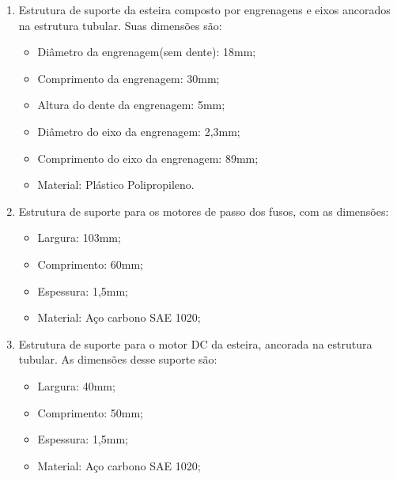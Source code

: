 \begin{enumerate}
\begin{enumerate}
    \item Estrutura de suporte da esteira composto por engrenagens e eixos ancorados na estrutura tubular. Suas dimensões são:
    \begin{itemize}
        \item Diâmetro da engrenagem(sem dente): 18mm;
        \item Comprimento da engrenagem: 30mm;
        \item Altura do dente da engrenagem: 5mm;
        \item Diâmetro do eixo da engrenagem: 2,3mm;
        \item Comprimento do eixo da engrenagem: 89mm;
        \item Material: Plástico Polipropileno.
    \end{itemize}
    
    \item Estrutura de suporte para os motores de passo dos fusos, com as dimensões:
    \begin{itemize}
        \item Largura: 103mm;
        \item Comprimento: 60mm;
        \item Espessura: 1,5mm;
        \item Material: Aço carbono SAE 1020;
    \end{itemize}
    
    \item Estrutura de suporte para o motor DC da esteira, ancorada na estrutura tubular. As dimensões desse suporte são:
    \begin{itemize}
        \item Largura: 40mm;
        \item Comprimento: 50mm;
        \item Espessura: 1,5mm;
        \item Material: Aço carbono SAE 1020;
    \end{itemize}
    
\end{enumerate}



\end{enumerate}
